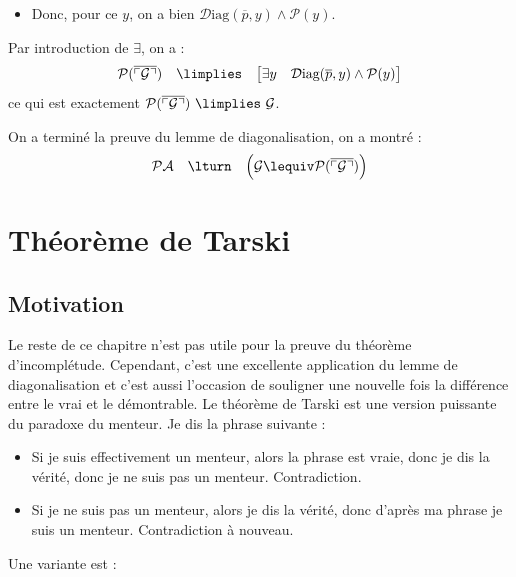 \documentclass[11pt,class=report,crop=false]{standalone}
\begin{document}
\begin{itemize}
\begin{itemize}
        \item Donc, pour ce $y$, on a bien $\mathcal{D}\text{iag}(\overline{p},y) \land \mathcal{P}(y)$.

    \end{itemize}

    Par introduction de $\exists$, on a :
    \[ \mathcal{P}(\overline{\ulcorner \mathcal{G} \urcorner}) \quad \limplies \quad \big[ \exists y \quad \mathcal{D}\text{iag}(\overline{p},y) \land \mathcal{P}(y) \big]\]
    ce qui est exactement $\mathcal{P}(\overline{\ulcorner \mathcal{G} \urcorner}) \  \limplies \ \mathcal{G}$.

    On a terminé la preuve du lemme de diagonalisation, on a montré :
    \[ \mathcal{PA} \quad \lturn \quad \Big( \mathcal{G} \lequiv \mathcal{P}(\overline{\ulcorner \mathcal{G} \urcorner}) \Big) \]
\end{itemize}


\section{Théorème de Tarski}

\subsection{Motivation}

Le reste de ce chapitre n'est pas utile pour la preuve du théorème d'incomplétude. Cependant, c'est une excellente application du lemme de diagonalisation et c'est aussi l'occasion de souligner une nouvelle fois la différence entre le vrai et le démontrable.
Le théorème de Tarski est une version puissante du paradoxe du menteur.
Je dis la phrase suivante : 
\begin{itemize}    
    \item Si je suis effectivement un menteur, alors la phrase est vraie, donc je dis la vérité, donc je ne suis pas un menteur. Contradiction.
    
    \item Si je ne suis pas un menteur, alors je dis la vérité, donc d'après ma phrase je suis un menteur. Contradiction à nouveau.
\end{itemize}

Une variante est : 
\end{document}

